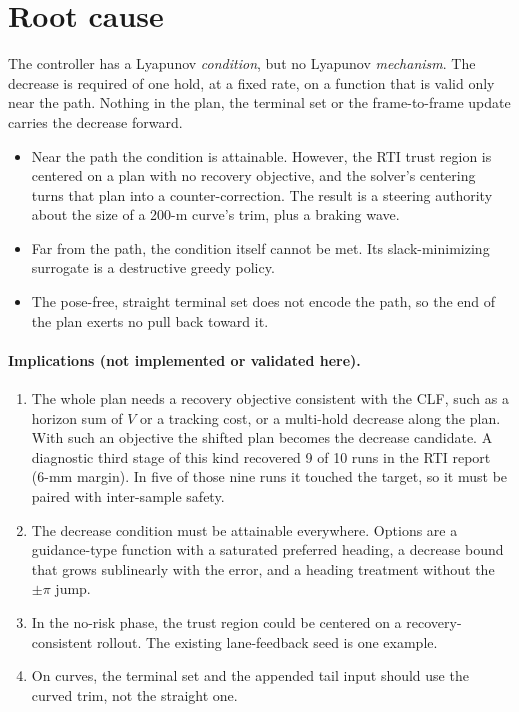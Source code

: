 \documentclass[11pt]{article}
\begin{document}
\section{Root cause}
The controller has a Lyapunov \emph{condition}, but no Lyapunov
\emph{mechanism}. The decrease is required of one hold, at a fixed rate, on a
function that is valid only near the path. Nothing in the plan, the terminal
set or the frame-to-frame update carries the decrease forward.
\begin{itemize}
\item Near the path the condition is attainable. However, the RTI trust region
is centered on a plan with no recovery objective, and the solver's centering
turns that plan into a counter-correction. The result is a steering authority
about the size of a 200-m curve's trim, plus a braking wave.
\item Far from the path, the condition itself cannot be met. Its slack-minimizing
surrogate is a destructive greedy policy.
\item The pose-free, straight terminal set does not encode the path, so the end
of the plan exerts no pull back toward it.
\end{itemize}

\paragraph{Implications (not implemented or validated here).}
\begin{enumerate}
\item The whole plan needs a recovery objective consistent with the CLF, such as
a horizon sum of $V$ or a tracking cost, or a multi-hold decrease along the
plan. With such an objective the shifted plan becomes the decrease candidate. A
diagnostic third stage of this kind recovered 9 of 10 runs in the RTI report
(6-mm margin).
In five of those nine runs it touched the target, so it must be paired with
inter-sample safety.
\item The decrease condition must be attainable everywhere. Options are a
guidance-type function with a saturated preferred heading, a decrease bound
that grows sublinearly with the error, and a heading treatment without the
$\pm\pi$ jump.
\item In the no-risk phase, the trust region could be centered on a
recovery-consistent rollout. The existing lane-feedback seed is one example.
\item On curves, the terminal set and the appended tail input should use the
curved trim, not the straight one.
\end{enumerate}
\end{document}
